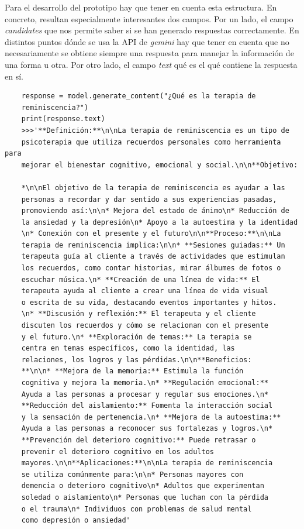 Para el desarrollo del prototipo hay que tener en cuenta esta estructura. En concreto, resultan especialmente interesantes dos campos. Por un lado, el campo \textit{candidates} que nos permite saber si se han generado respuestas correctamente. En distintos puntos dónde se usa la API de \textit{gemini} hay que tener en cuenta que no necesariamente se obtiene siempre una respuesta para manejar la información de una forma u otra. Por otro lado, el campo \textit{text} qué es el qué contiene la respuesta en sí. 

\begin{verbatim}
	response = model.generate_content("¿Qué es la terapia de 
	reminiscencia?")
	print(response.text)
	>>>'**Definición:**\n\nLa terapia de reminiscencia es un tipo de
	psicoterapia que utiliza recuerdos personales como herramienta para
	mejorar el bienestar cognitivo, emocional y social.\n\n**Objetivo:
	
	*\n\nEl objetivo de la terapia de reminiscencia es ayudar a las
	personas a recordar y dar sentido a sus experiencias pasadas, 
	promoviendo así:\n\n* Mejora del estado de ánimo\n* Reducción de 
	la ansiedad y la depresión\n* Apoyo a la autoestima y la identidad
	\n* Conexión con el presente y el futuro\n\n**Proceso:**\n\nLa 
	terapia de reminiscencia implica:\n\n* **Sesiones guiadas:** Un
	terapeuta guía al cliente a través de actividades que estimulan
	los recuerdos, como contar historias, mirar álbumes de fotos o
	escuchar música.\n* **Creación de una línea de vida:** El
	terapeuta ayuda al cliente a crear una línea de vida visual
	o escrita de su vida, destacando eventos importantes y hitos.
	\n* **Discusión y reflexión:** El terapeuta y el cliente
	discuten los recuerdos y cómo se relacionan con el presente
	y el futuro.\n* **Exploración de temas:** La terapia se 
	centra en temas específicos, como la identidad, las 
	relaciones, los logros y las pérdidas.\n\n**Beneficios:
	**\n\n* **Mejora de la memoria:** Estimula la función 
	cognitiva y mejora la memoria.\n* **Regulación emocional:**
	Ayuda a las personas a procesar y regular sus emociones.\n*
	**Reducción del aislamiento:** Fomenta la interacción social
	y la sensación de pertenencia.\n* **Mejora de la autoestima:**
	Ayuda a las personas a reconocer sus fortalezas y logros.\n*
	**Prevención del deterioro cognitivo:** Puede retrasar o
	prevenir el deterioro cognitivo en los adultos
	mayores.\n\n**Aplicaciones:**\n\nLa terapia de reminiscencia
	se utiliza comúnmente para:\n\n* Personas mayores con
	demencia o deterioro cognitivo\n* Adultos que experimentan
	soledad o aislamiento\n* Personas que luchan con la pérdida
	o el trauma\n* Individuos con problemas de salud mental
	como depresión o ansiedad'
	
\end{verbatim}

